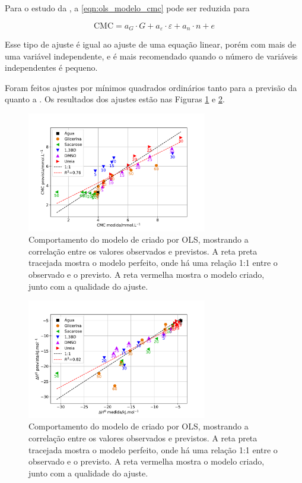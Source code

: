 		Para o estudo da \cmc, a \autoref{eqn:ols_modelo_cmc} pode ser reduzida para
		
		\begin{equation}
		\textrm{CMC} = a_G \cdot G + a_\varepsilon \cdot \varepsilon + a_n \cdot n + e
		\label{eqn:ols_modelo_cmc}
		\end{equation}
		
		Esse tipo de ajuste é igual ao ajuste de uma equação linear, porém com mais de uma variável independente, e é mais recomendado quando o número de variáveis independentes é pequeno.\cite{MarciaQuimiometria}
		
		Foram feitos ajustes por mínimos quadrados ordinários tanto para a previsão da \cmc{} quanto a \DHmic. Os resultados dos ajustes estão nas Figuras \ref{fig:ols_cmc_python} e \ref{fig:ols_dh_python}.
		
		\begin{figure}[h]
			\centering
			\includegraphics[width=0.7\textwidth]{imagens/itc/ols_cmc_python}
			\caption{Comportamento do modelo de \cmc{} criado por OLS, mostrando a correlação entre os valores observados e previstos. A reta preta tracejada mostra o modelo perfeito, onde há uma relação 1:1 entre o observado e o previsto. A reta vermelha mostra o modelo criado, junto com a qualidade do ajuste.}
			\label{fig:ols_cmc_python}
		\end{figure}
		
		\begin{figure}[h]
			\centering
			\includegraphics[width=0.7\textwidth]{imagens/itc/ols_dh_python}
			\caption{Comportamento do modelo de \DHmic{} criado por OLS, mostrando a correlação entre os valores observados e previstos. A reta preta tracejada mostra o modelo perfeito, onde há uma relação 1:1 entre o observado e o previsto. A reta vermelha mostra o modelo criado, junto com a qualidade do ajuste.}
			\label{fig:ols_dh_python}
		\end{figure}

